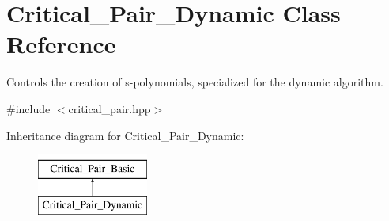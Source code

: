 \hypertarget{class_critical___pair___dynamic}{}\section{Critical\+\_\+\+Pair\+\_\+\+Dynamic Class Reference}
\label{class_critical___pair___dynamic}


Controls the creation of s-\/polynomials, specialized for the dynamic algorithm.  




{\ttfamily \#include $<$critical\+\_\+pair.\+hpp$>$}

Inheritance diagram for Critical\+\_\+\+Pair\+\_\+\+Dynamic\+:\begin{figure}[H]
\begin{center}
\leavevmode
\includegraphics[height=2.000000cm]{class_critical___pair___dynamic}
\end{center}
\end{figure}
